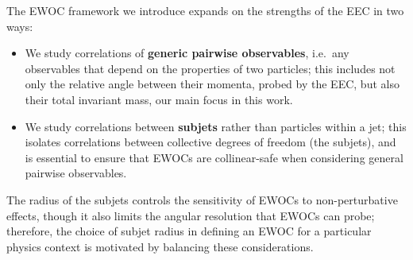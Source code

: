 



The EWOC framework we introduce expands on the strengths of the EEC in two ways:
\begin{itemize}
    \item
        We study correlations of \textbf{generic pairwise observables}, i.e.~any observables that depend on the properties of two particles;
        this includes not only the relative angle between their momenta, probed by the EEC, but also their total invariant mass, our main focus in this work.

    \item
        We study correlations between \textbf{subjets} rather than particles within a jet;
        this isolates correlations between collective degrees of freedom (the subjets), and is essential to ensure that EWOCs are collinear-safe when considering general pairwise observables.
\end{itemize}
%
The radius of the subjets controls the sensitivity of EWOCs to non-perturbative effects, though it also limits the angular resolution that EWOCs can probe;
%
therefore, the choice of subjet radius in defining an EWOC for a particular physics context is motivated by balancing these considerations.


